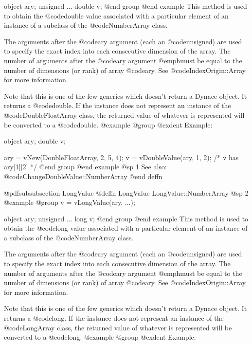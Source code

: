 object    ary;
unsigned  ...
double    v;
@end group
@end example
This method is used to obtain the @code{double} value associated with a
particular element of an instance of a subclass of the
@code{NumberArray} class.

The arguments after the @code{ary} argument (each an @code{unsigned})
are used to specify the exact index into each consecutive dimension of
the array.  The number of arguments after the @code{ary} argument
@emph{must} be equal to the number of dimensions (or rank) of array
@code{ary}.  See @code{IndexOrigin::Array} for more information.

Note that this is one of the few generics which doesn't return a Dynace
object.  It returns a @code{double}.  If the instance does not represent
an instance of the @code{DoubleFloatArray} class, the returned value of
whatever is represented will be converted to a @code{double}.
@example
@group
@exdent Example:

object  ary;
double  v;

ary = vNew(DoubleFloatArray, 2, 5, 4);
v = vDoubleValue(ary, 1, 2);
/*  v has ary[1][2]  */
@end group
@end example
@sp 1
See also:  @code{ChangeDoubleValue::NumberArray}
@end deffn











@pdfsubsubsection {LongValue}
@deffn {LongValue} LongValue::NumberArray
@sp 2
@example
@group
v = vLongValue(ary, ...);

object    ary;
unsigned  ...
long      v;
@end group
@end example
This method is used to obtain the @code{long} value associated with a
particular element of an instance of a subclass of the
@code{NumberArray} class.

The arguments after the @code{ary} argument (each an @code{unsigned})
are used to specify the exact index into each consecutive dimension of
the array.  The number of arguments after the @code{ary} argument
@emph{must} be equal to the number of dimensions (or rank) of array
@code{ary}.  See @code{IndexOrigin::Array} for more information.

Note that this is one of the few generics which doesn't return a Dynace
object.  It returns a @code{long}.  If the instance does not represent
an instance of the @code{LongArray} class, the returned value of
whatever is represented will be converted to a @code{long}.
@example
@group
@exdent Example:

